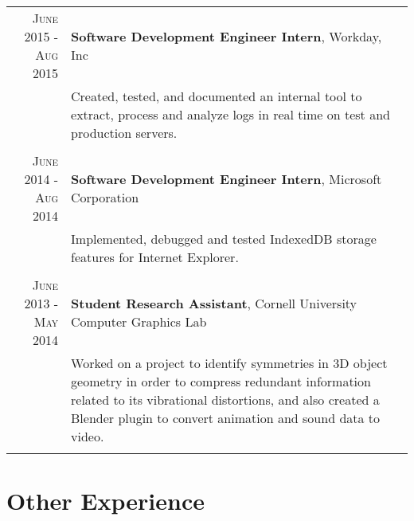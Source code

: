 \documentclass[a4paper,10pt]{article} %
\begin{document}
\begin{tabular}{rp{11.8cm}}
\textsc{June 2015 - Aug 2015} & \textbf{Software Development Engineer Intern}, Workday, Inc\\
& \small{Created, tested, and documented an internal tool to extract, process and analyze logs in real time on test and production servers.}\\
\multicolumn{2}{c}{} \\


\textsc{June 2014 - Aug 2014} & \textbf{Software Development Engineer Intern}, Microsoft Corporation\\
& \small{Implemented, debugged and tested IndexedDB storage features for Internet Explorer.}\\
\multicolumn{2}{c}{} \\


\textsc{June 2013 - May 2014} & \textbf{Student Research Assistant}, Cornell University Computer Graphics Lab\\
& \small{Worked on a project to identify symmetries in 3D object geometry in order to compress redundant information related to its vibrational distortions, and also created a Blender plugin to convert animation and sound data to video.}\\
\multicolumn{2}{c}{} \\

\end{tabular}


\section{Other Experience}
\end{document}
